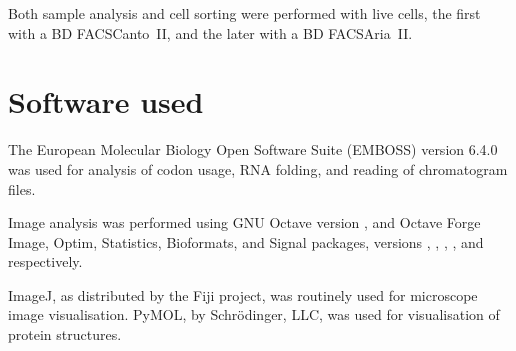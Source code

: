       Both sample analysis and cell sorting were performed with live cells, the
      first with a BD FACSCanto~II, and the later with a BD FACSAria~II.

  \section{Software used}
    \label{sec:methods:software}
    The European Molecular Biology Open Software Suite (EMBOSS) version 6.4.0
    was used for analysis of codon usage, RNA folding, and reading of
    chromatogram files.

    Image analysis was performed using GNU Octave version \OctaveVersion{},
    and Octave Forge Image, Optim, Statistics, Bioformats, and Signal
    packages, versions \OctaveImageVersion{}, \OctaveOptimVersion{},
    \OctaveStatisticsVersion{}, \OctaveBioformatsVersion{}, and
    \OctaveSignalVersion{} respectively.

    ImageJ, as distributed by the Fiji project, was routinely used
    for microscope image visualisation.  PyMOL, by Schrödinger, LLC,
    was used for visualisation of protein structures.
